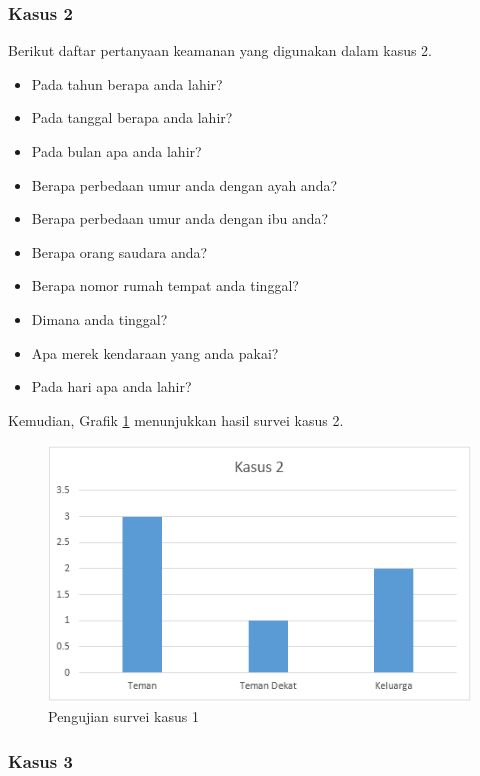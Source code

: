 \subsubsection{Kasus 2}

Berikut daftar pertanyaan keamanan yang digunakan dalam kasus 2.
\begin{itemize}
	\item Pada tahun berapa anda lahir?
	\item Pada tanggal berapa anda lahir?
	\item Pada bulan apa anda lahir?
	\item Berapa perbedaan umur anda dengan ayah anda?
	\item Berapa perbedaan umur anda dengan ibu anda?
	\item Berapa orang saudara anda?
	\item Berapa nomor rumah tempat anda tinggal?
	\item Dimana anda tinggal?
	\item Apa merek kendaraan yang anda pakai?
	\item Pada hari apa anda lahir?
\end{itemize}

Kemudian, Grafik \ref{fig:kasus2} menunjukkan hasil survei kasus 2.
\begin{figure}[H]
	\includegraphics[scale=0.7]{Gambar/kasus2}
	\centering
	\caption{Pengujian survei kasus 1}\label{fig:kasus2}
\end{figure}

\subsubsection{Kasus 3}

